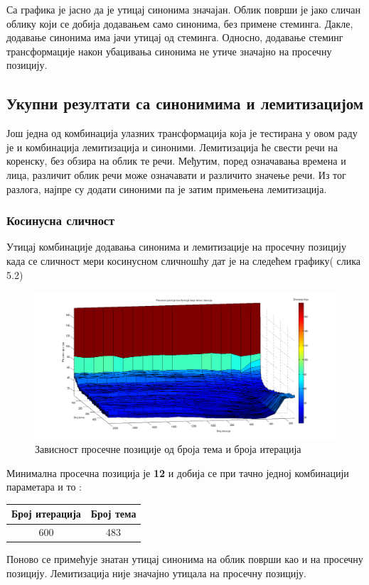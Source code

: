 Са графика је јасно да је утицај синонима значајан. Облик површи је јако сличан облику који се добија додавањем само синонима, без примене стеминга. Дакле, додавање синонима има јачи утицај од стеминга. Односно, додавање стеминг трансформације након убацивања синонима не утиче значајно на просечну позицију. 

\subsection{Укупни резултати са синонимима и лемитизацијом}

Још једна од комбинација улазних трансформација која је тестирана у овом раду је и комбинација лемитизација и синоними. Лемитизација ће свести речи на коренску, без обзира на облик те речи. Међутим, поред означавања времена и лица, различит облик речи може означавати и различито значење речи. Из тог разлога, најпре су додати синоними па је затим примењена лемитизација.

\subsubsection{Косинусна сличност}



Утицај  комбинације додавања синонима и лемитизације на просечну позицију  када се сличност мери косинусном сличношћу дат је на следећем графику( слика 5.2)


		\begin{figure}[H]
    \centering
   \includegraphics[scale=0.3]{./Slike/LemmSyn.png} 
	\caption{Зависност просечне позиције од броја тема и броја итерација}
	\label{fig:slika1}
\end{figure}

Минимална просечна позиција је \textbf{12} и добија се при тачно једној комбинацији параметара и то :

\begin{center}
\begin{tabular}{|c|c|}
\hline
Број итерација & Број тема \\
\hline\hline
600 & 483 \\

\hline
\end{tabular}
\end{center}

Поново се примећује знатан утицај синонима на облик површи као и на просечну позицију. Лемитизација није значајно утицала на просечну позицију.
